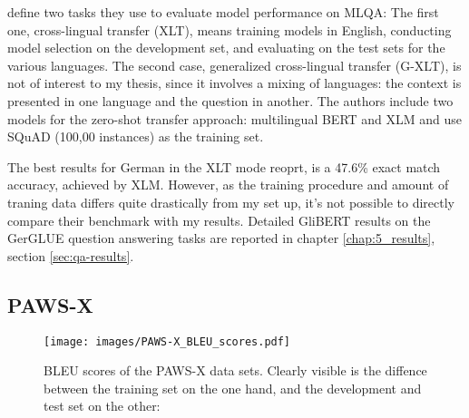 

\label{chap:mlqa-sota}

\citeauthor{lewis2019mlqa} define two tasks they use to evaluate model performance on
MLQA: The first one, cross-lingual transfer (XLT), means training models in English,
conducting model selection on the development set, and evaluating on the test sets for
the various languages. The second case, generalized cross-lingual transfer (G-XLT), is
not of interest to my thesis, since it involves a mixing of languages: the context is
presented in one language and the question in another. The authors include two models
for the zero-shot transfer approach: multilingual BERT and XLM and use SQuAD (100,00
instances) as the training set.

The best results for German in the XLT mode \citeauthor{lewis2019mlqa} reoprt, is a 47.6\% exact
match accuracy, achieved by XLM. However, as the training procedure and amount of traning data
differs quite drastically from my set up, it's not possible to directly compare their benchmark
with my results. Detailed GliBERT results on the GerGLUE question answering tasks are reported
in chapter \ref{chap:5_results}, section \ref{sec:qa-results}.




\subsection{PAWS-X}
\label{sec:paws-x}

\begin{wrapfigure}[21]{l}{0.45\linewidth}
  \begin{center}
    \texttt{[image: images/PAWS-X\_BLEU\_scores.pdf]}
  \end{center}
  \caption[PAWS-X BLEU]{BLEU scores of the PAWS-X data sets. Clearly visible is the diffence between the training set on the one hand,
                      and the development and test set on the other:}
\end{wrapfigure}

